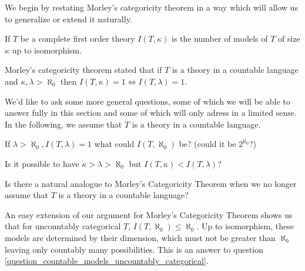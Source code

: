 We begin by restating Morley's categoricity theorem in a way which will allow us to generalize or extend it naturally.

\begin{definition}\label{definition_number_models}
If \(T\) be a complete first order theory \(I(T, \kappa)\) is the number of models of \(T\) of size \(\kappa\) up to isomorphism.
\end{definition}

Morley's categoricity theorem stated that if \(T\) is a theory in a countable language and \(\kappa, \lambda > \aleph_0\) then \(I(T, \kappa) = 1 \iff I(T, \lambda) = 1\). 

We'd like to ask some more general questions, some of which we will be able to answer fully in this section and some of which will only adress in a limited sense. 
In the following, we assume that \(T\) is a theory in a countable language. 

\begin{question}\label{question_countable_models_uncountably_categorical}
If \(\lambda > \aleph_0, I(T, \lambda) = 1\) what could \(I(T, \aleph_0)\) be? (could it be \(2^{\aleph_0}\)?)
\end{question}


\begin{question}\label{question_morleys_conjecture}
Is it possible to have \(\kappa > \lambda > \aleph_0\) but \(I(T, \kappa) < I(T, \lambda)\)?
\end{question}

\begin{question}\label{question_los_conjecture_uncountable_languages}
Is there a natural analogue to Morley's Categoricity Theorem when we no longer assume that \(T\) is a theory in a countable language?
\end{question}

An easy extension of our argument for Morley's Categoricity Theorem shows us that for uncountably categorical \(T\), \(I(T, \aleph_0)\leq \aleph_0\).
Up to isomorphism, these models are determined by their dimension, which must not be greater than \(\aleph_0\) leaving only countably many possibilities. 
This is an answer to question \ref{question_countable_models_uncountably_categorical}.

